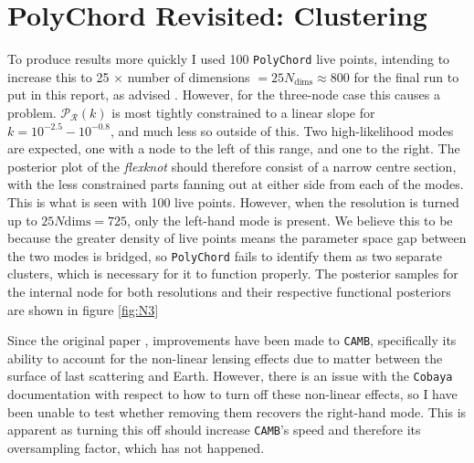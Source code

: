 \documentclass{article}
\begin{document}
\newpage

\section{PolyChord Revisited: Clustering}
\label{sec:polychord_revisited}

To produce results more quickly I used 100 \texttt{PolyChord} live points, intending to increase this to 25 $\times$ number of dimensions $= 25 N_\textrm{dims} \approx800$ for the final run to put in this report, as advised \cite{PolyChord_1, PolyChord_2, Sonke}. However, for the three-node case this causes a problem. $\mathcal P_\mathcal R(k)$ is most tightly constrained to a linear slope for $k = 10^{-2.5} - 10^{-0.8}$, and much less so outside of this. Two high-likelihood modes are expected, one with a node to the left of this range, and one to the right. The posterior plot of the \textit{flexknot} should therefore consist of a narrow centre section, with the less constrained parts fanning out at either side from each of the modes. This is what is seen with 100 live points. However, when the resolution is turned up to $25N\textrm{dims}=725$, only the left-hand mode is present. We believe this to be because the greater density of live points means the parameter space gap between the two modes is bridged, so \texttt{PolyChord} fails to identify them as two separate clusters, which is necessary for it to function properly. The posterior samples for the internal node for both resolutions and their respective functional posteriors are shown in figure \ref{fig:N3}

Since the original paper \cite{Handley2019}, improvements have been made to \texttt{CAMB}, specifically its ability to account for the non-linear lensing effects due to matter between the surface of last scattering and Earth. However, there is an issue with the \texttt{Cobaya} documentation with respect to how to turn off these non-linear effects, so I have been unable to test whether removing them recovers the right-hand mode. This is apparent as turning this off should increase \texttt{CAMB}'s speed and therefore its oversampling factor, which has not happened.
\end{document}
